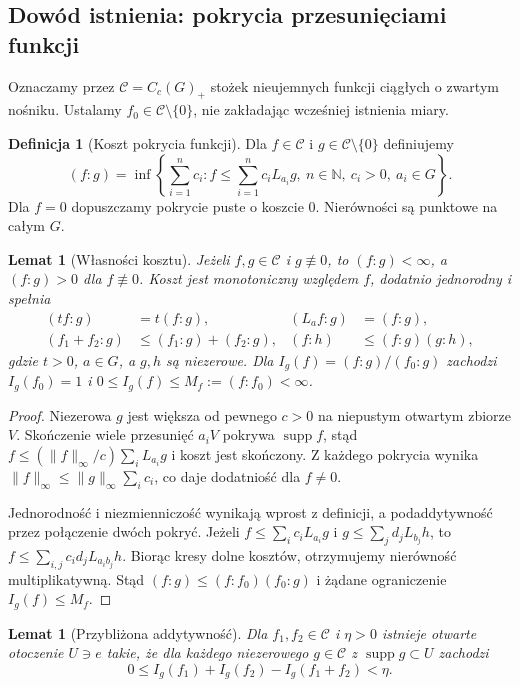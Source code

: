 \documentclass[11pt,a4paper]{article}
\numberwithin{equation}{section}
\theoremstyle{plain}
\newtheorem{lemat}[twierdzenie]{Lemat}
\theoremstyle{definition}
\newtheorem{definicja}[twierdzenie]{Definicja}
\theoremstyle{remark}
\newcommand{\N}{\mathbb N}
\newcommand{\supp}{\operatorname{supp}}
\begin{document}
\subsection*{Dowód istnienia: pokrycia przesunięciami funkcji}
Oznaczamy przez $\mathcal C=C_c(G)_+$ stożek nieujemnych funkcji ciągłych o zwartym nośniku. Ustalamy $f_0\in\mathcal C\setminus\{0\}$, nie zakładając wcześniej istnienia miary.
\begin{definicja}[Koszt pokrycia funkcji]
Dla $f\in\mathcal C$ i $g\in\mathcal C\setminus\{0\}$ definiujemy
\[
(f:g)=\inf\left\{\sum_{i=1}^n c_i:f\le\sum_{i=1}^n c_iL_{a_i}g,\ n\in\N,\ c_i>0,\ a_i\in G\right\}.
\]
Dla $f=0$ dopuszczamy pokrycie puste o koszcie $0$. Nierówności są punktowe na całym $G$.
\end{definicja}
\begin{lemat}[Własności kosztu]
Jeżeli $f,g\in\mathcal C$ i $g\not\equiv0$, to $(f:g)<\infty$, a $(f:g)>0$ dla $f\not\equiv0$. Koszt jest monotoniczny względem $f$, dodatnio jednorodny i spełnia
\[
\begin{aligned}
(tf:g)&=t(f:g), & (L_af:g)&=(f:g),\\
(f_1+f_2:g)&\le(f_1:g)+(f_2:g), & (f:h)&\le(f:g)(g:h),
\end{aligned}
\]
gdzie $t>0$, $a\in G$, a $g,h$ są niezerowe. Dla $I_g(f)=(f:g)/(f_0:g)$ zachodzi $I_g(f_0)=1$ i $0\le I_g(f)\le M_f:=(f:f_0)<\infty$.
\end{lemat}
\begin{proof}
Niezerowa $g$ jest większa od pewnego $c>0$ na niepustym otwartym zbiorze $V$. Skończenie wiele przesunięć $a_iV$ pokrywa $\supp f$, stąd $f\le(\|f\|_\infty/c)\sum_iL_{a_i}g$ i koszt jest skończony. Z każdego pokrycia wynika $\|f\|_\infty\le\|g\|_\infty\sum_ic_i$, co daje dodatniość dla $f\ne0$.

Jednorodność i niezmienniczość wynikają wprost z definicji, a podaddytywność przez połączenie dwóch pokryć. Jeżeli $f\le\sum_ic_iL_{a_i}g$ i $g\le\sum_jd_jL_{b_j}h$, to $f\le\sum_{i,j}c_id_jL_{a_ib_j}h$. Biorąc kresy dolne kosztów, otrzymujemy nierówność multiplikatywną. Stąd $(f:g)\le(f:f_0)(f_0:g)$ i żądane ograniczenie $I_g(f)\le M_f$.
\end{proof}
\begin{lemat}[Przybliżona addytywność]
Dla $f_1,f_2\in\mathcal C$ i $\eta>0$ istnieje otwarte otoczenie $U\ni e$ takie, że dla każdego niezerowego $g\in\mathcal C$ z $\supp g\subset U$ zachodzi
\[
0\le I_g(f_1)+I_g(f_2)-I_g(f_1+f_2)<\eta.
\]
\end{lemat}
\end{document}

